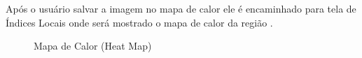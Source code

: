     Após o usuário salvar a imagem no mapa de calor ele é encaminhado para tela de Índices Locais onde será mostrado o mapa de calor da região .
    
    \begin{figure}[H]
        \centering
        \caption{Mapa de Calor (Heat Map)}%
        \label{phot:pg-6}
    \end{figure}

